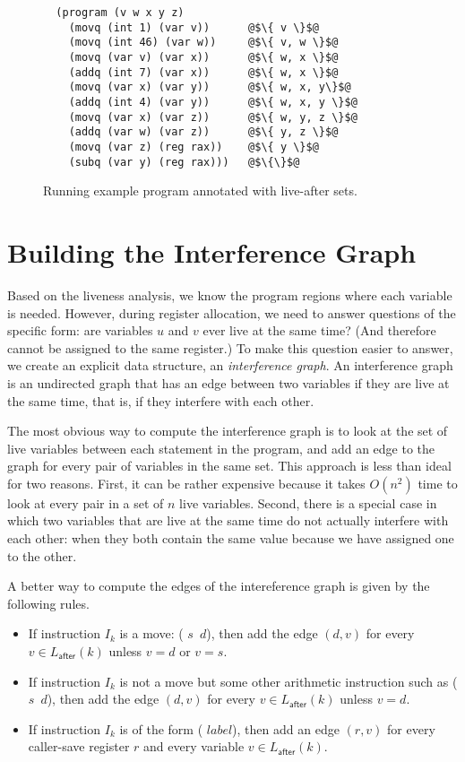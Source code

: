 \documentclass[12pt]{book}
\begin{document}
\begin{figure}[tbp]
\begin{lstlisting}
  (program (v w x y z)
    (movq (int 1) (var v))      @$\{ v \}$@
    (movq (int 46) (var w))     @$\{ v, w \}$@
    (movq (var v) (var x))      @$\{ w, x \}$@
    (addq (int 7) (var x))      @$\{ w, x \}$@
    (movq (var x) (var y))      @$\{ w, x, y\}$@
    (addq (int 4) (var y))      @$\{ w, x, y \}$@
    (movq (var x) (var z))      @$\{ w, y, z \}$@
    (addq (var w) (var z))      @$\{ y, z \}$@
    (movq (var z) (reg rax))    @$\{ y \}$@
    (subq (var y) (reg rax)))   @$\{\}$@
\end{lstlisting}
\caption{Running example program annotated with live-after sets.}
\label{fig:live-eg}
\end{figure}


\section{Building the Interference Graph}

Based on the liveness analysis, we know the program regions where each
variable is needed.  However, during register allocation, we need to
answer questions of the specific form: are variables $u$ and $v$ ever
live at the same time?  (And therefore cannot be assigned to the same
register.)  To make this question easier to answer, we create an
explicit data structure, an \emph{interference graph}.  An
interference graph is an undirected graph that has an edge between two
variables if they are live at the same time, that is, if they
interfere with each other.

The most obvious way to compute the interference graph is to look at
the set of live variables between each statement in the program, and
add an edge to the graph for every pair of variables in the same set.
This approach is less than ideal for two reasons. First, it can be
rather expensive because it takes $O(n^2)$ time to look at every pair
in a set of $n$ live variables. Second, there is a special case in
which two variables that are live at the same time do not actually
interfere with each other: when they both contain the same value
because we have assigned one to the other.

A better way to compute the edges of the intereference graph is given
by the following rules.

\begin{itemize}
\item If instruction $I_k$ is a move: ( $s$\, $d$), then add
  the edge $(d,v)$ for every $v \in L_{\mathsf{after}}(k)$ unless $v =
  d$ or $v = s$.

\item If instruction $I_k$ is not a move but some other arithmetic
  instruction such as ( $s$\, $d$), then add the edge $(d,v)$
  for every $v \in L_{\mathsf{after}}(k)$ unless $v = d$.
  
\item If instruction $I_k$ is of the form (
  $\mathit{label}$), then add an edge $(r,v)$ for every caller-save
  register $r$ and every variable $v \in L_{\mathsf{after}}(k)$.
\end{itemize}
\end{document}
